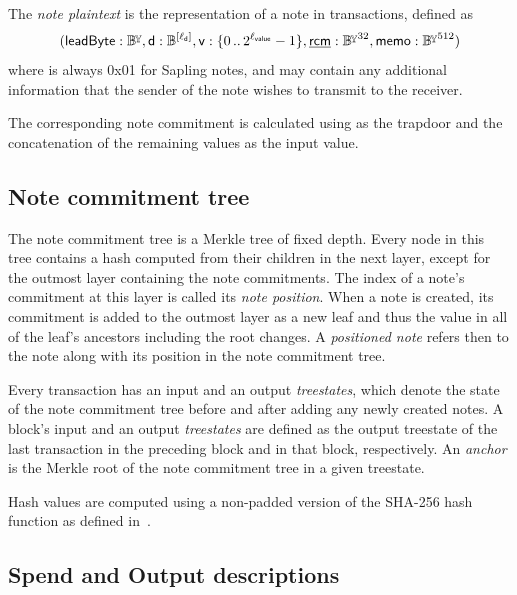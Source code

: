 \medskip
The \emph{note plaintext} \np is the representation of a note in transactions, defined as
\[
    (\lby : \By, \dvf : \B^{[\ld]}, \val : \{0\,..\,2^{\lval}-1\}, \underline{\rcm} : \By^{32}, \memo : \By^{512})
\]
where \lby is always 0x01 for Sapling notes, and \memo may contain any additional information that the sender of the note wishes to transmit to the receiver.

The corresponding note commitment is calculated using \rcm as the trapdoor and the concatenation of the remaining values as the input value.

\subsection{Note commitment tree}

The note commitment tree is a Merkle tree of fixed depth.
Every node in this tree contains a hash computed from their children in the next layer, except for the outmost layer containing the note commitments.
The index of a note's commitment at this layer is called its \emph{note position}.
When a note is created, its commitment is added to the outmost layer as a new leaf and thus the value in all of the leaf's ancestors including the root changes.
A \emph{positioned note} refers then to the note along with its position in the note commitment tree.

Every transaction has an input and an output \emph{treestates}, which denote the state of the note commitment tree before and after adding any newly created notes.
A block's input and an output \emph{treestates} are defined as the output treestate of the last transaction in the preceding block and in that block, respectively.
An \emph{anchor} is the Merkle root of the note commitment tree in a given treestate.

Hash values are computed using a non-padded version of the SHA-256 hash function as defined in~\cite{nist2015shs}.

\subsection{Spend and Output descriptions}

